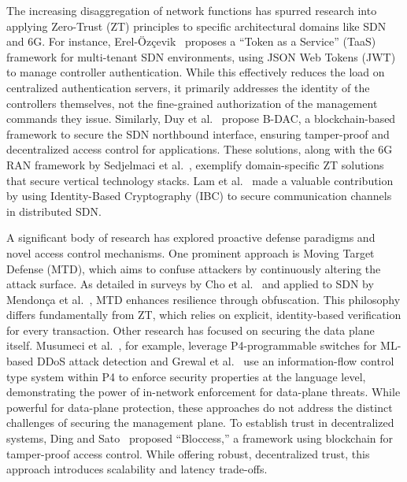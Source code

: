 \documentclass[12pt, a4paper, reqno, oneside]{book}
\begin{document}
The increasing disaggregation of network functions has spurred research into applying Zero-Trust (ZT) principles to specific architectural domains like SDN and 6G. For instance, Erel-Özçevik~\cite{Erel-Ozcevik2024} proposes a ``Token as a Service'' (TaaS) framework for multi-tenant SDN environments, using JSON Web Tokens (JWT) to manage controller authentication. While this effectively reduces the load on centralized authentication servers, it primarily addresses the identity of the controllers themselves, not the fine-grained authorization of the management commands they issue. Similarly, Duy et al.~\cite{duy2022} propose B-DAC, a blockchain-based framework to secure the SDN northbound interface, ensuring tamper-proof and decentralized access control for applications. These solutions, along with the 6G RAN framework by Sedjelmaci et al.~\cite{Sedjelmaci2024}, exemplify domain-specific ZT solutions that secure vertical technology stacks. Lam et al.~\cite{lam2015securing} made a valuable contribution by using Identity-Based Cryptography (IBC) to secure communication channels in distributed SDN. 


A significant body of research has explored proactive defense paradigms and novel access control mechanisms. One prominent approach is Moving Target Defense (MTD), which aims to confuse attackers by continuously altering the attack surface. As detailed in surveys by Cho et al.~\cite{cho2020survey} and applied to SDN by Mendonça et al.~\cite{mendonca2022security}, MTD enhances resilience through obfuscation. This philosophy differs fundamentally from ZT, which relies on explicit, identity-based verification for every transaction. Other research has focused on securing the data plane itself. Musumeci et al.~\cite{Musumeci2021}, for example, leverage P4-programmable switches for ML-based DDoS attack detection and  Grewal et al.~\cite{grewal2022p4bid} use an information-flow control type system within P4 to enforce security properties at the language level, demonstrating the power of in-network enforcement for data-plane threats. While powerful for data-plane protection, these approaches do not address the distinct challenges of securing the management plane. To establish trust in decentralized systems, Ding and Sato~\cite{Ding2022} proposed ``Bloccess,'' a framework using blockchain for tamper-proof access control. While offering robust, decentralized trust, this approach introduces scalability and latency trade-offs.
\end{document}
